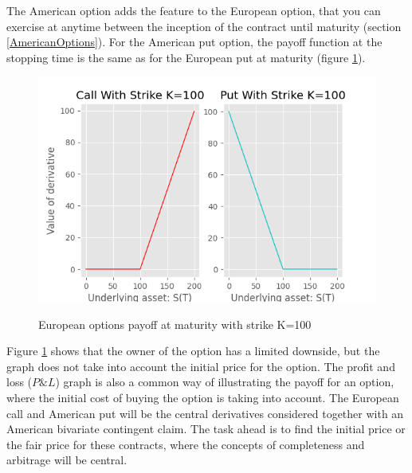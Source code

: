 The American option adds the feature to the European option, that you can exercise at anytime between the inception of the contract until maturity (section \ref{AmericanOptions}). For the American put option, the payoff function at the stopping time is the same as for the European put at maturity (figure \ref{fig:contractfct}). 

\begin{figure}[H]
\centering
\includegraphics{Figures/contractfct.png}\\
\decoRule
\caption[Contract Functions]{European options payoff at maturity with strike K=100}
\label{fig:contractfct}
\end{figure}

Figure \ref{fig:contractfct} shows that the owner of the option has a limited downside, but the graph does not take into account the initial price for the option. The profit and loss ($P\& L$) graph is also a common way of illustrating the payoff for an option, where the initial cost of buying the option is taking into account. The European call and American put will be the central derivatives considered together with an American bivariate contingent claim. The task ahead is to find the initial price or the fair price for these contracts, where the concepts of completeness and arbitrage will be central.


